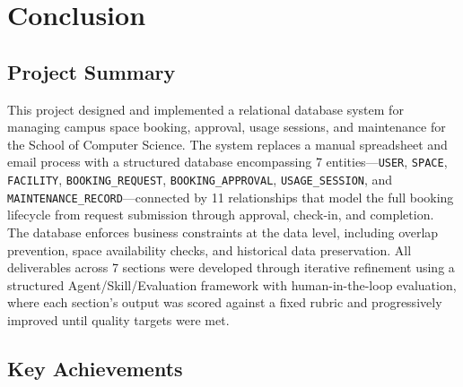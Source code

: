 
\section{Conclusion}


\subsection{Project Summary}

This project designed and implemented a relational database system for managing campus space booking, approval, usage sessions, and maintenance for the School of Computer Science. The system replaces a manual spreadsheet and email process with a structured database encompassing 7 entities---\texttt{USER}, \texttt{SPACE}, \texttt{FACILITY}, \texttt{BOOKING\_REQUEST}, \texttt{BOOKING\_APPROVAL}, \texttt{USAGE\_SESSION}, and \texttt{MAINTENANCE\_RECORD}---connected by 11 relationships that model the full booking lifecycle from request submission through approval, check-in, and completion. The database enforces business constraints at the data level, including overlap prevention, space availability checks, and historical data preservation. All deliverables across 7 sections were developed through iterative refinement using a structured Agent/Skill/Evaluation framework with human-in-the-loop evaluation, where each section's output was scored against a fixed rubric and progressively improved until quality targets were met.


\subsection{Key Achievements}

